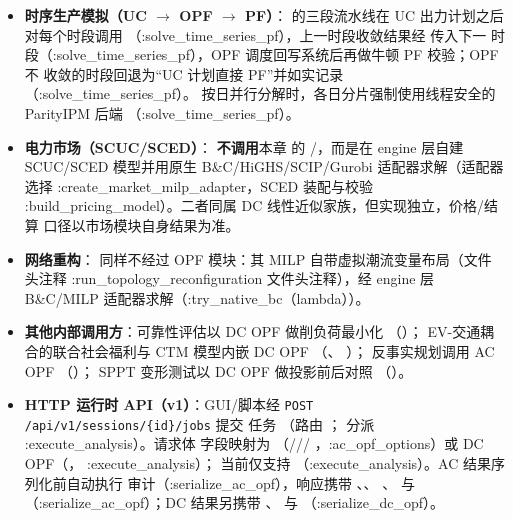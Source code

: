 \begin{itemize}
  \item \textbf{时序生产模拟（UC $\to$ OPF $\to$ PF）}：
         的三段流水线在
        UC 出力计划之后对每个时段调用 
        （:solve\_time\_series\_pf），上一时段收敛结果经  传入下一
        时段（:solve\_time\_series\_pf），OPF 调度回写系统后再做牛顿 PF 校验；OPF 不
        收敛的时段回退为“UC 计划直接 PF”并如实记录（:solve\_time\_series\_pf）。
        按日并行分解时，各日分片强制使用线程安全的 ParityIPM 后端
        （:solve\_time\_series\_pf）。
  \item \textbf{电力市场（SCUC/SCED）}：
         \textbf{不调用}本章
        的 /，而是在
        engine 层自建 SCUC/SCED 模型并用原生 B\&C/HiGHS/SCIP/Gurobi
        适配器求解（适配器选择 :create\_market\_milp\_adapter，SCED 装配与校验
        :build\_pricing\_model）。二者同属 DC 线性近似家族，但实现独立，价格/结算
        口径以市场模块自身结果为准。
  \item \textbf{网络重构}：
        同样不经过 OPF 模块：其 MILP 自带虚拟潮流变量布局（文件头注释
        :run\_topology\_reconfiguration 文件头注释），经 engine 层 B\&C/MILP 适配器求解（:try\_native\_bc（lambda））。
  \item \textbf{其他内部调用方}：可靠性评估以 DC OPF 做削负荷最小化
        （）；
        EV-交通耦合的联合社会福利与 CTM 模型内嵌 DC OPF
        （、
        ）；
        反事实规划调用 AC OPF
        （）；
        SPPT 变形测试以 DC OPF 做投影前后对照
        （）。
  \item \textbf{HTTP 运行时 API（v1）}：GUI/脚本经
        \texttt{POST /api/v1/sessions/\{id\}/jobs} 提交
         任务
        （路由 ；
        分派 :execute\_analysis）。请求体  字段映射为
        （///
        ，:ac\_opf\_options）或 DC OPF（，
        :execute\_analysis）； 当前仅支持
        （:execute\_analysis）。AC 结果序列化前自动执行
         审计（:serialize\_ac\_opf），响应携带
        、、
        、 与
        （:serialize\_ac\_opf）；DC 结果另携带 、
         与 （:serialize\_dc\_opf）。
\end{itemize}

